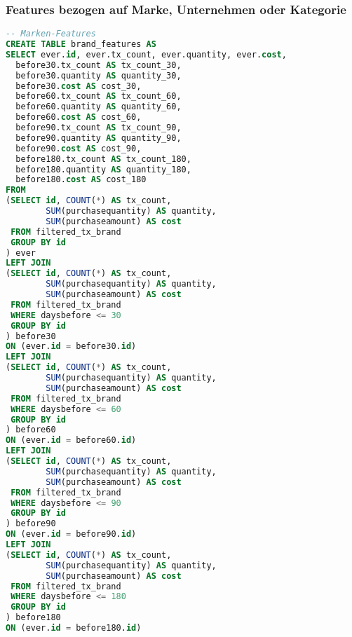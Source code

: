 \subsubsection{Features bezogen auf Marke, Unternehmen oder Kategorie}
\label{sql:features_bcc}
\begin{lstlisting}[language=SQL]
-- Marken-Features
CREATE TABLE brand_features AS
SELECT ever.id, ever.tx_count, ever.quantity, ever.cost,
  before30.tx_count AS tx_count_30,
  before30.quantity AS quantity_30,
  before30.cost AS cost_30,
  before60.tx_count AS tx_count_60,
  before60.quantity AS quantity_60,
  before60.cost AS cost_60,
  before90.tx_count AS tx_count_90,
  before90.quantity AS quantity_90,
  before90.cost AS cost_90,
  before180.tx_count AS tx_count_180,
  before180.quantity AS quantity_180,
  before180.cost AS cost_180
FROM 
(SELECT id, COUNT(*) AS tx_count, 
        SUM(purchasequantity) AS quantity, 
        SUM(purchaseamount) AS cost
 FROM filtered_tx_brand
 GROUP BY id
) ever
LEFT JOIN
(SELECT id, COUNT(*) AS tx_count, 
        SUM(purchasequantity) AS quantity, 
        SUM(purchaseamount) AS cost
 FROM filtered_tx_brand
 WHERE daysbefore <= 30
 GROUP BY id
) before30
ON (ever.id = before30.id)
LEFT JOIN
(SELECT id, COUNT(*) AS tx_count, 
        SUM(purchasequantity) AS quantity, 
        SUM(purchaseamount) AS cost
 FROM filtered_tx_brand
 WHERE daysbefore <= 60
 GROUP BY id
) before60
ON (ever.id = before60.id)
LEFT JOIN
(SELECT id, COUNT(*) AS tx_count, 
        SUM(purchasequantity) AS quantity, 
        SUM(purchaseamount) AS cost
 FROM filtered_tx_brand
 WHERE daysbefore <= 90
 GROUP BY id
) before90
ON (ever.id = before90.id)
LEFT JOIN 
(SELECT id, COUNT(*) AS tx_count,
        SUM(purchasequantity) AS quantity, 
        SUM(purchaseamount) AS cost
 FROM filtered_tx_brand
 WHERE daysbefore <= 180
 GROUP BY id
) before180
ON (ever.id = before180.id)


\end{lstlisting}
